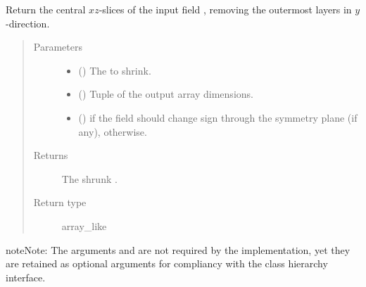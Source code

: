 \documentclass[letterpaper,10pt,english]{sphinxmanual}
\begin{document}
\begin{fulllineitems}

\begin{fulllineitems}
\label{\detokenize{api:tasmania.dycore.horizontal_boundary_periodic.PeriodicXZ.from_computational_to_physical_domain}}
Return the central \(xz\)-slices of the input field , removing the  outermost
layers in \(y\)-direction.
\begin{quote}\begin{description}
\item[{Parameters}] \leavevmode\begin{itemize}
\item {} 
 () \textendash{} The  to shrink.

\item {} 
 () \textendash{} Tuple of the output array dimensions.

\item {} 
 () \textendash{}  if the field should change sign through the symmetry plane (if any),  otherwise.

\end{itemize}

\item[{Returns}] \leavevmode
The shrunk .

\item[{Return type}] \leavevmode
array\_like

\end{description}\end{quote}

\begin{sphinxadmonition}{note}{Note:}
The arguments  and  are not required by the implementation,
yet they are retained as optional arguments for compliancy with the class hierarchy interface.
\end{sphinxadmonition}


\end{fulllineitems}
\end{fulllineitems}
\end{document}
